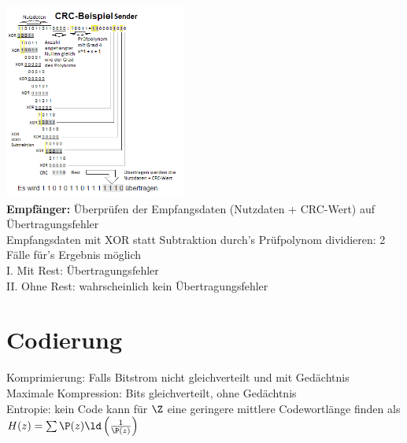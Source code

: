 \documentclass[fs, footer]{latex4ei}
\begin{document}
\begin{multicols*}{4}
{	\includegraphics[width = 6cm]{./img/CRC_Bsp.png}\\
	\textbf{Empfänger:} 
	Überprüfen der Empfangsdaten (Nutzdaten + CRC-Wert) auf Übertragungsfehler \\
	Empfangsdaten mit XOR statt Subtraktion durch's Prüfpolynom dividieren: 
	2 Fälle für's Ergebnis möglich \\
	I. Mit Rest: Übertragungsfehler \\
	II. Ohne Rest: wahrscheinlich kein Übertragungsfehler \\

} 



\section{Codierung}
	Komprimierung: Falls Bitstrom nicht gleichverteilt und mit Gedächtnis\\
	Maximale Kompression: Bits gleichverteilt, ohne Gedächtnis\\
	Entropie: kein Code kann für $\Z$ eine geringere mittlere Codewortlänge finden als $H(z) = \sum \P(z) \ld\left(\frac{1}{\P(z)}\right)$\\




\end{multicols*}
\end{document}
